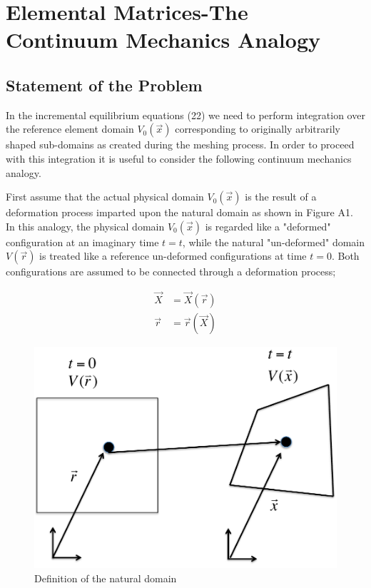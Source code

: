 %
\chapter{Elemental Matrices-The Continuum Mechanics Analogy}

\section{Statement of the Problem}
In the incremental equilibrium equations (22) we need to perform integration over the reference element domain $V_0(\vec{x})$ corresponding to originally arbitrarily shaped sub-domains as created during the meshing process.  In order to proceed with this integration it is useful to consider the following continuum mechanics analogy.

First assume that the actual physical domain $V_0(\vec{x})$ is the result of a deformation process imparted upon the natural domain as shown in Figure A1. In this analogy, the physical domain $V_0(\vec{x})$ is regarded like a "deformed" configuration at an imaginary time $t=t$, while the natural "un-deformed" domain $V(\vec{r})$   is treated like a reference un-deformed configurations at time $t=0$. Both configurations are assumed to be connected through a deformation process;


\begin{equation}
\begin{aligned}
\vec{X}&=\vec{X}(\vec{r})\\
\vec{r}&=\vec{r}(\vec{X})
\end{aligned}
\label{motion}
\end{equation}

\begin{figure}[h]
\centering
\includegraphics[width=12cm]{img/figure1.pdf}
\caption{Definition of the natural domain}
\label{fig:natural domain}
\end{figure}

